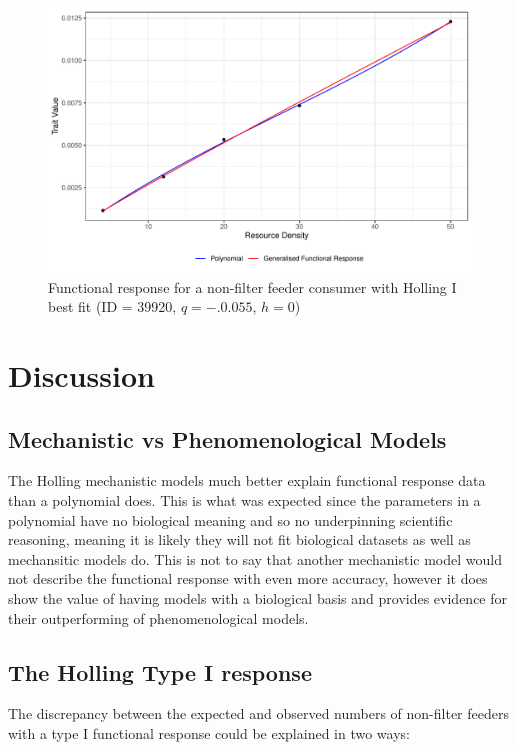 \documentclass[11pt, a4paper, titlepage]{article}
\begin{document}
\begin{figure}[ht!]
	\centering\includegraphics[width=1\textwidth]{../Results/Holling1_example.pdf}
	\caption{Functional response for a non-filter feeder consumer with Holling I best fit (ID = 39920, $q = -.0.055$, $h = 0$)}
\end{figure}




\section{Discussion}

\subsection{Mechanistic vs Phenomenological Models}

The Holling mechanistic models much better explain functional response data than a polynomial does. This is what was expected since the parameters in a polynomial have no biological meaning and so no underpinning scientific reasoning, meaning it is likely they will not fit biological datasets as well as mechansitic models do.
This is not to say that another mechanistic model would not describe the functional response with even more accuracy, however it does show the value of having models with a biological basis and provides evidence for their outperforming of phenomenological models.

\subsection{The Holling Type I response}

The discrepancy between the expected and observed numbers of non-filter feeders with a type I functional response could be explained in two ways:
\end{document}
